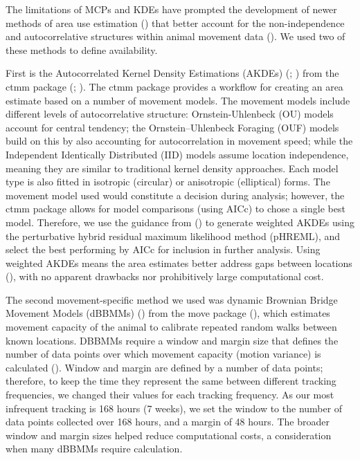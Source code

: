 \documentclass[10pt,a4paper]{article}
\begin{document}
The limitations of MCPs and KDEs have prompted the development of newer methods of area use estimation () that better account for the non-independence and autocorrelative structures within animal movement data ().
We used two of these methods to define availability.

First is the Autocorrelated Kernel Density Estimations (AKDEs) (; ) from the ctmm package (; ).
The ctmm package provides a workflow for creating an area estimate based on a number of movement models.
The movement models include different levels of autocorrelative structure: Ornstein-Uhlenbeck (OU) models account for central tendency; the Ornstein--Uhlenbeck Foraging (OUF) models build on this by also accounting for autocorrelation in movement speed; while the Independent Identically Distributed (IID) models assume location independence, meaning they are similar to traditional kernel density approaches.
Each model type is also fitted in isotropic (circular) or anisotropic (elliptical) forms.
The movement model used would constitute a decision during analysis; however, the ctmm package allows for model comparisons (using AICc) to chose a single best model.
Therefore, we use the guidance from () to generate weighted AKDEs using the perturbative hybrid residual maximum likelihood method (pHREML), and select the best performing by AICc for inclusion in further analysis.
Using weighted AKDEs means the area estimates better address gaps between locations (), with no apparent drawbacks nor prohibitively large computational cost.

The second movement-specific method we used was dynamic Brownian Bridge Movement Models (dBBMMs) () from the move package (), which estimates movement capacity of the animal to calibrate repeated random walks between known locations.
DBBMMs require a window and margin size that defines the number of data points over which movement capacity (motion variance) is calculated ().
Window and margin are defined by a number of data points; therefore, to keep the time they represent the same between different tracking frequencies, we changed their values for each tracking frequency.
As our most infrequent tracking is 168 hours (7 weeks), we set the window to the number of data points collected over 168 hours, and a margin of 48 hours.
The broader window and margin sizes helped reduce computational costs, a consideration when many dBBMMs require calculation.
\end{document}
